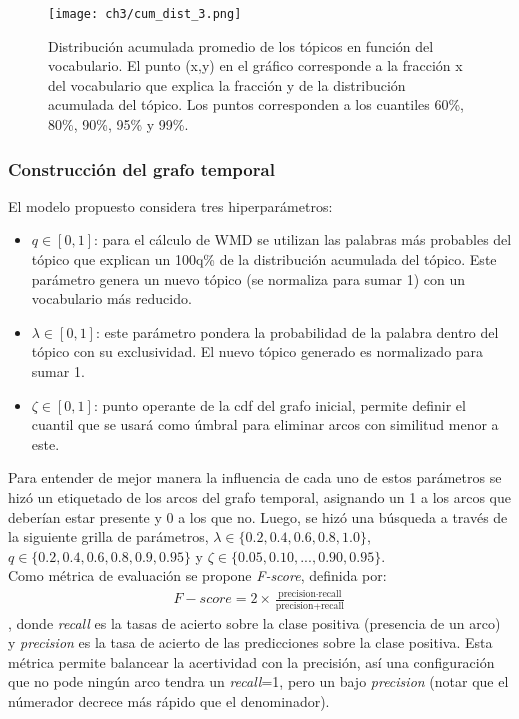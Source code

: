 \documentclass[letterpaper,12pt,oneside]{book} %
\begin{document}
\begin{figure}
    \centering
    \texttt{[image: ch3/cum\_dist\_3.png]}
    \caption{Distribución acumulada promedio de los tópicos en función del vocabulario. El punto (x,y) en el gráfico corresponde a la fracción x del vocabulario que explica la fracción y de la distribución acumulada del tópico. Los puntos corresponden a los cuantiles 60\%, 80\%, 90\%, 95\% y 99\%.}
    \label{img:cum_dist3}
\end{figure}

\subsubsection{Construcción del grafo temporal}

El modelo propuesto considera tres hiperparámetros:
\begin{itemize}
    \item $q \in [0,1]$: para el cálculo de WMD se utilizan las palabras más probables del tópico que explican un 100q\% de la distribución acumulada del tópico. Este parámetro genera un nuevo tópico (se normaliza para sumar 1) con un vocabulario más reducido.
    \item $\lambda \in [0,1]$: este parámetro pondera la probabilidad de la palabra dentro del tópico con su exclusividad. El nuevo tópico generado es normalizado para sumar 1.
    \item $\zeta \in [0,1]$: punto operante de la cdf del grafo inicial, permite definir el cuantil que se usará como úmbral para eliminar arcos con similitud menor a este. 
\end{itemize}

Para entender de mejor manera la influencia de cada uno de estos parámetros se hizó un etiquetado de los arcos del grafo temporal, asignando un 1 a los arcos que deberían estar presente y 0 a los que no. Luego, se hizó una búsqueda a través de la siguiente grilla de parámetros, $\lambda \in \{0.2, 0.4, 0.6, 0.8, 1.0\}$, $q \in \{0.2, 0.4, 0.6, 0.8, 0.9, 0.95\}$ y $\zeta \in \{0.05, 0.10, ..., 0.90, 0.95\}$. \\

Como métrica de evaluación se propone \textit{F-score}, definida por:
\begin{align}
    F-score = 2\times \frac{\text{precision}\cdot \text{recall}}{\text{precision}+\text{recall}}
\end{align}
, donde \textit{recall} es la tasas de acierto sobre la clase positiva (presencia de un arco) y \textit{precision} es la tasa de acierto de las predicciones sobre la clase positiva. Esta métrica permite balancear la acertividad con la precisión, así una configuración que no pode ningún arco tendra un \textit{recall}=1, pero un bajo \textit{precision} (notar que el númerador decrece más rápido que el denominador). \\
\end{document}
